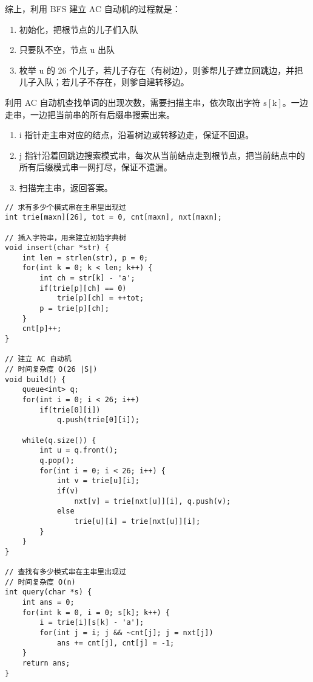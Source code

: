 \documentclass[UTF8]{article}
\begin{document}
综上，利用 BFS 建立 AC 自动机的过程就是：

\begin{enumerate}
	\item 初始化，把根节点的儿子们入队
	\item 只要队不空，节点 u 出队
	\item 枚举 u 的 26 个儿子，若儿子存在（有树边），则爹帮儿子建立回跳边，并把儿子入队；若儿子不存在，则爹自建转移边。
\end{enumerate}

利用 AC 自动机查找单词的出现次数，需要扫描主串，依次取出字符 $\mathrm{s[k]}$。一边走串，一边把当前串的所有后缀串搜索出来。

\begin{enumerate}
	\item i 指针走主串对应的结点，沿着树边或转移边走，保证不回退。												
	\item j 指针沿着回跳边搜索模式串，每次从当前结点走到根节点，把当前结点中的所有后缀模式串一网打尽，保证不遗漏。
	\item 扫描完主串，返回答案。
\end{enumerate}

\begin{lstlisting}[caption=AC 自动机]
// 求有多少个模式串在主串里出现过
int trie[maxn][26], tot = 0, cnt[maxn], nxt[maxn];

// 插入字符串，用来建立初始字典树
void insert(char *str) {
	int len = strlen(str), p = 0;
	for(int k = 0; k < len; k++) {
		int ch = str[k] - 'a';
		if(trie[p][ch] == 0)
			trie[p][ch] = ++tot;
		p = trie[p][ch];
	}
	cnt[p]++;
}

// 建立 AC 自动机
// 时间复杂度 O(26 |S|)
void build() {
    queue<int> q;
    for(int i = 0; i < 26; i++)
        if(trie[0][i])
            q.push(trie[0][i]);
    
    while(q.size()) {
        int u = q.front();
        q.pop();
        for(int i = 0; i < 26; i++) {
            int v = trie[u][i];
            if(v)
                nxt[v] = trie[nxt[u]][i], q.push(v);
            else
                trie[u][i] = trie[nxt[u]][i];
        }
    }
}

// 查找有多少模式串在主串里出现过
// 时间复杂度 O(n)
int query(char *s) {
    int ans = 0;
    for(int k = 0, i = 0; s[k]; k++) {
        i = trie[i][s[k] - 'a'];
        for(int j = i; j && ~cnt[j]; j = nxt[j])
            ans += cnt[j], cnt[j] = -1;
    }
    return ans;
}
\end{lstlisting}
\end{document}
